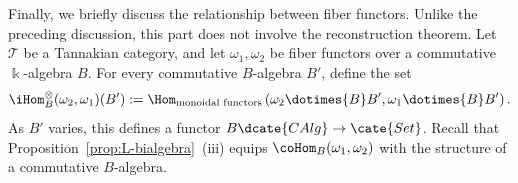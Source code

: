 Finally, we briefly discuss the relationship between fiber functors. Unlike
the preceding discussion, this part does not involve the reconstruction
theorem. Let $\mathcal{T}$ be a Tannakian category, and let
$\omega_1,\omega_2$ be fiber functors over a commutative $\Bbbk$-algebra
$B$. For every commutative $B$-algebra $B'$, define the set
\begin{equation*}
	\iHom^\otimes_B(\omega_2, \omega_1)(B') := \Hom_{\text{monoidal functors}}\left( \omega_2 \dotimes{B} B', \omega_1 \dotimes{B} B' \right).
\end{equation*}
As $B'$ varies, this defines a functor
$B\dcate{CAlg}\to\cate{Set}$. Recall that
Proposition~\ref{prop:L-bialgebra}~(iii) equips
$\coHom_B(\omega_1,\omega_2)$ with the structure of a commutative
$B$-algebra.

